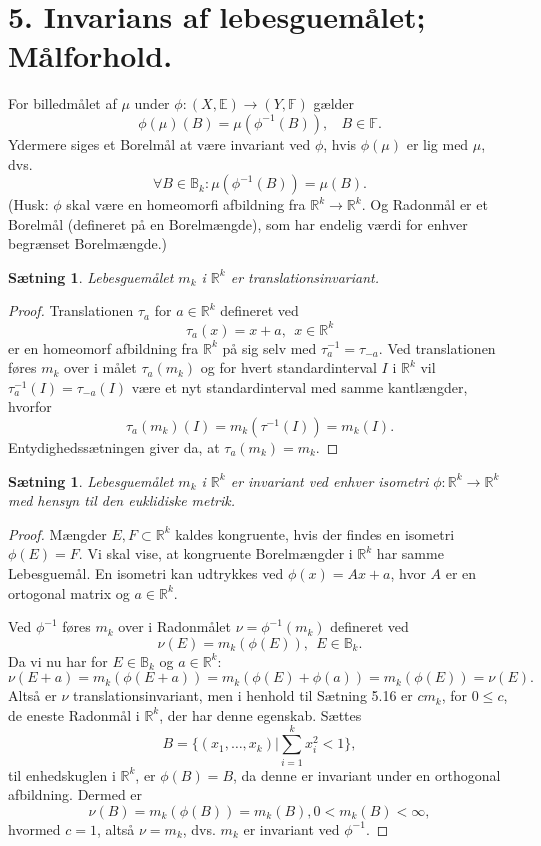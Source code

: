 \documentclass[12pt]{report}
\newtheorem{theorem}[lemma]{Sætning}
\theoremstyle{break}
\newtheorem*{proof}{Bevis}
\theoremstyle{break}
\newcommand{\RR}{\mathbb{R}}
\newcommand{\EE}{\mathbb{E}}
\newcommand{\FF}{\mathbb{F}}
\newcommand{\1}{\mathds{1}}
\begin{document}
\section*{5. Invarians af lebesguemålet; Målforhold.}
For billedmålet af $\mu$ under $\phi\colon(X,\EE)\to(Y,\FF)$ gælder
\[\phi(\mu)(B) = \mu(\phi^{-1}(B)),~~~~B\in\FF.\]
Ydermere siges et Borelmål at være invariant ved $\phi$, hvis $\phi(\mu)$ er lig med $\mu$, dvs.
\[\forall B\in\mathbb{B}_k\colon\mu(\phi^{-1}(B))=\mu(B).\]
(Husk: $\phi$ skal være en homeomorfi afbildning fra $\RR^k\to\RR^k$. Og Radonmål er et Borelmål (defineret på en Borelmængde), som har endelig værdi for enhver begrænset Borelmængde.)
\begin{theorem}
Lebesguemålet $m_k$ i $\RR^k$ er translationsinvariant.
\end{theorem}
\begin{proof}
Translationen $\tau_a$ for $a\in\RR^k$ defineret ved
\[\tau_a(x)=x+a,~~x\in\RR^k\]
er en homeomorf afbildning fra $\RR^k$ på sig selv med $\tau_a^{-1} = \tau_{-a}$. Ved translationen føres $m_k$ over i målet $\tau_a(m_k)$ og for hvert standardinterval $I$ i $\RR^k$ vil $\tau_a^{-1}(I) = \tau_{-a}(I)$ være et nyt standardinterval med samme kantlængder, hvorfor
\[\tau_a(m_k)(I)=m_k(\tau^{-1}(I))=m_k(I).\]
Entydighedssætningen giver da, at $\tau_a(m_k)=m_k$.
\end{proof}
\begin{theorem}
Lebesguemålet $m_k$ i $\RR^k$ er invariant ved enhver isometri $\phi\colon\RR^k\to\RR^k$ med hensyn til den euklidiske metrik.
\end{theorem}
\begin{proof}
Mængder $E,F\subset\RR^k$ kaldes kongruente, hvis der findes en isometri $\phi(E)=F$. Vi skal vise, at kongruente Borelmængder i $\RR^k$ har samme Lebesguemål. En isometri kan udtrykkes ved $\phi(x)=Ax+a$, hvor $A$ er en ortogonal matrix og $a\in\RR^k$.

\bigskip

Ved $\phi^{-1}$ føres $m_k$ over i Radonmålet $\nu=\phi^{-1}(m_k)$ defineret ved \[\nu(E)=m_k(\phi(E)),~~E\in\mathbb{B}_k.\]
Da vi nu har for $E\in\mathbb{B}_k$ og $a\in\RR^k$:
\[\nu(E+a)=m_k(\phi(E+a))=m_k(\phi(E)+\phi(a))=m_k(\phi(E))=\nu(E).\]
Altså er $\nu$ translationsinvariant, men i henhold til Sætning 5.16 er $cm_k$, for $0\leq c$, de eneste Radonmål i $\RR^k$, der har denne egenskab. Sættes
\[B=\{(x_1,\ldots,x_k)\vert\sum_{i=1}^kx_i^2<1\},\]
til enhedskuglen i $\RR^k$, er $\phi(B)=B$, da denne er invariant under en orthogonal afbildning. Dermed er
\[\nu(B)=m_k(\phi(B))=m_k(B), 0<m_k(B)<\infty,\]
hvormed $c=1$, altså $\nu=m_k$, dvs. $m_k$ er invariant ved $\phi^{-1}$.
\end{proof}
\end{document}
